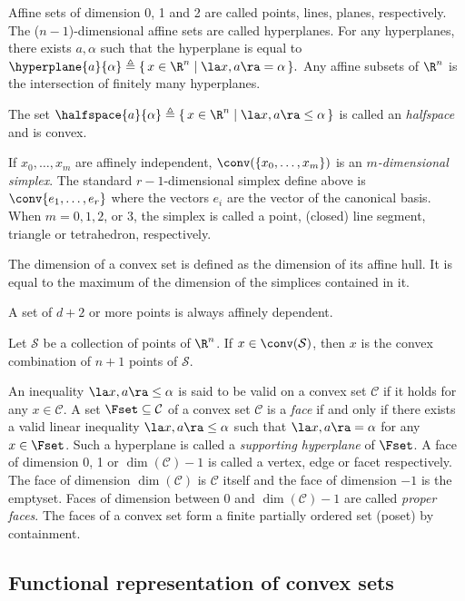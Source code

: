 \documentclass[11pt,twoside,a4paper,openright]{uclouvain-thesis}
\newcommand{\Cset}{\mathcal{C}}
\begin{document}
Affine sets of dimension 0, 1 and 2 are called points, lines, planes, respectively.
The ($n-1$)-dimensional affine sets are called hyperplanes.
For any hyperplanes, there exists $a, \alpha$ such that the hyperplane is equal to
\( \hyperplane{a}{\alpha} \triangleq \{\, x \in \R^n \mid \la x, a \ra = \alpha \,\}. \)
Any affine subsets of $\R^n$ is the intersection of finitely many hyperplanes.

The set
\( \halfspace{a}{\alpha} \triangleq \{\, x \in \R^n \mid \la x, a \ra \leq \alpha \,\} \)
is called an \emph{halfspace} and is convex.

If $x_0, \ldots, x_m$ are affinely independent, $\conv(\{x_0, \ldots, x_m\})$ is an \emph{$m$-dimensional simplex}.
The standard $r-1$-dimensional simplex define above is $\conv\{e_1, \ldots, e_r\}$ where the vectors $e_i$ are the vector of the canonical basis.
When $m = 0, 1, 2$, or 3, the simplex is called a point, (closed) line segment, triangle or tetrahedron, respectively.

The dimension of a convex set is defined as the dimension of its affine hull.
It is equal to the maximum of the dimension of the simplices contained in it.

A set of $d+2$ or more points is always affinely dependent.
\begin{mytheo}
  Let $\mathcal{S}$ be a collection of points of $\R^n$.
  If $x \in \conv(\mathcal{S})$, then $x$ is the convex combination of $n+1$ points of $\mathcal{S}$.
\end{mytheo}

An inequality $\la x, a \ra \leq \alpha$ is said to be valid on a convex set $\Cset$ if it holds for any $x \in \Cset$.
A set $\Fset \subseteq \Cset$ of a convex set $\Cset$ is a \emph{face} if and only if there exists a valid linear inequality $\la x, a \ra \leq \alpha$ such that $\la x, a \ra = \alpha$ for any $x \in \Fset$.
Such a hyperplane is called a \emph{supporting hyperplane} of $\Fset$.
A face of dimension 0, 1 or $\dim(\Cset)-1$ is called a vertex, edge or facet respectively.
The face of dimension $\dim(\Cset)$ is $\Cset$ itself and the face of dimension $-1$ is the emptyset.
Faces of dimension between 0 and $\dim(\Cset)-1$ are called \emph{proper faces}.
The faces of a convex set form a finite partially ordered set (poset) by containment.


\subsection{Functional representation of convex sets}
\end{document}
